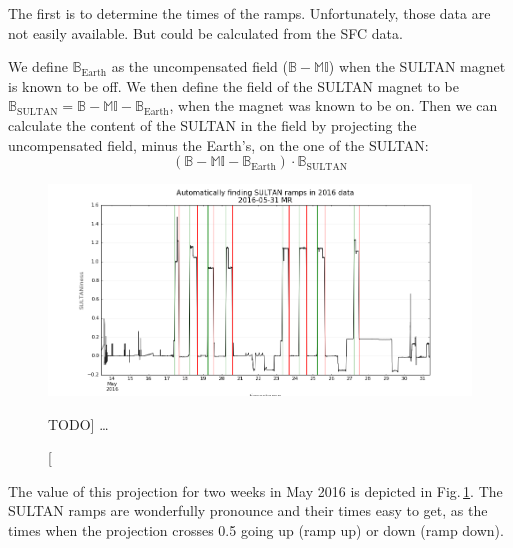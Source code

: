 The first is to determine the times of the ramps. Unfortunately, those data are not easily available. But could be calculated from the SFC data.

We define $\mathbb{B}_\text{Earth}$ as the uncompensated field ($\mathbb{B} - \mathbb{M} \mathbb{I}$) when the SULTAN magnet is known to be off. We then define the field of the SULTAN magnet to be $\mathbb{B}_\text{SULTAN} = \mathbb{B} - \mathbb{M} \mathbb{I} - \mathbb{B}_\text{Earth}$, when the magnet was known to be on. Then we can calculate the content of the SULTAN in the field by projecting the uncompensated field, minus the Earth's, on the one of the SULTAN:
\begin{equation}
  \left( \mathbb{B} - \mathbb{M} \mathbb{I} - \mathbb{B}_\text{Earth} \right) \cdot \mathbb{B}_\text{SULTAN}  
\end{equation}

\begin{figure}
  \centering
  \includegraphics[width=.7\linewidth]{gfx/nEDM_SFC/finding_SULTAN_ramps.png}
  \caption
  [TODO]
  {\ldots}
  \label{fig:finding_SULTAN_ramps}
\end{figure}

The value of this projection for two weeks in May 2016 is depicted in Fig.\,\ref{fig:finding_SULTAN_ramps}. The SULTAN ramps are wonderfully pronounce and their times easy to get, as the times when the projection crosses 0.5 going up (ramp up) or down (ramp down).

